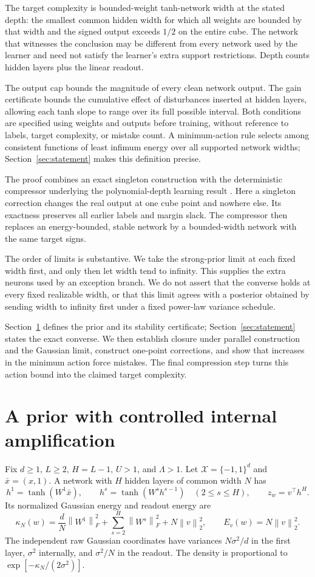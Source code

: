\documentclass[11pt]{article}
\theoremstyle{remark}\newtheorem{remark}[theorem]{Remark}
\newcommand{\norm}[1]{\left\lVert#1\right\rVert}
\newcommand{\cX}{\mathcal X}\newcommand{\cS}{\mathcal S}
\begin{document}
The target complexity is bounded-weight tanh-network width at the stated
depth: the smallest common hidden width for which all weights are bounded
by that width and the signed output exceeds $1/2$ on the entire cube.
The network that witnesses the conclusion may be different from every
network used by the learner and need not satisfy the learner's extra
support restrictions. Depth counts hidden layers plus the linear readout.

The output cap bounds the magnitude of every clean network output. The
gain certificate bounds the cumulative effect of disturbances inserted
at hidden layers, allowing each tanh slope to range over its full
possible interval. Both conditions are specified using weights and
outputs before training, without reference to labels, target complexity,
or mistake count. A minimum-action rule selects among consistent
functions of least infimum energy over all supported network widths;
Section~\ref{sec:statement} makes this definition precise.

The proof combines an exact singleton construction with the deterministic
compressor underlying the polynomial-depth learning result
\cite{quartic}. Here a singleton correction changes the real output at
one cube point and nowhere else. Its exactness preserves all earlier
labels and margin slack. The compressor then replaces an energy-bounded,
stable network by a bounded-width network with the same target signs.

The order of limits is substantive. We take the strong-prior limit at
each fixed width first, and only then let width tend to infinity. This
supplies the extra neurons used by an exception branch. We do not assert
that the converse holds at every fixed realizable width, or that this
limit agrees with a posterior obtained by sending width to infinity
first under a fixed power-law variance schedule.

Section~\ref{sec:prior} defines the prior and its stability certificate;
Section~\ref{sec:statement} states the exact converse. We then establish
closure under parallel construction and the Gaussian limit, construct
one-point corrections, and show that increases in the minimum action
force mistakes. The final compression step turns this action bound into
the claimed target complexity.

\section{A prior with controlled internal amplification}\label{sec:prior}
Fix $d\ge1$, $L\ge2$, $H=L-1$, $U>1$, and $\Lambda>1$.
Let $\cX=\{-1,1\}^d$ and $\bar x=(x,1)$. A network with $H$ hidden
layers of common width $N$ has
\[
 h^1=\tanh(W^1\bar x),\qquad
 h^s=\tanh(W^sh^{s-1})\quad(2\le s\le H),\qquad
 z_w=v^\top h^H.
\]
Its normalized Gaussian energy and readout energy are
\[
 \kappa_N(w)=\frac dN\norm{W^1}_F^2+
 \sum_{s=2}^H\norm{W^s}_F^2+N\norm v_2^2,
 \qquad E_v(w)=N\norm v_2^2.
\]
The independent raw Gaussian coordinates have variances
$N\sigma^2/d$ in the first layer, $\sigma^2$ internally, and
$\sigma^2/N$ in the readout. The density is proportional to
$\exp[-\kappa_N/(2\sigma^2)]$.
\end{document}
